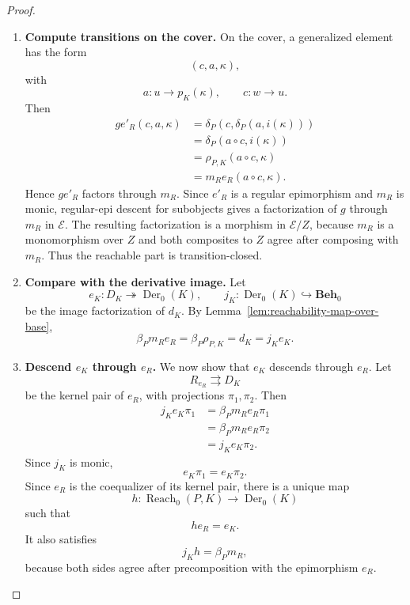 \begin{proof}
\begin{enumerate}
        \item \textbf{Compute transitions on the cover.} On the cover, a generalized element has the form
        \[
            (c,a,\kappa),
        \]
        with
        \[
            a:u\to p_K(\kappa),
            \qquad
            c:w\to u.
        \]
        Then
        \[
            \begin{aligned}
                g e'_R(c,a,\kappa)
                &=
                \delta_P(c,\delta_P(a,i(\kappa)))
                \\
                &=
                \delta_P(a\circ c,i(\kappa))
                \\
                &=
                \rho_{P,K}(a\circ c,\kappa)
                \\
                &=
                m_R e_R(a\circ c,\kappa).
            \end{aligned}
        \]
        Hence \(g e'_R\) factors through \(m_R\). Since \(e'_R\) is a regular epimorphism and \(m_R\) is monic, regular-epi descent for subobjects gives a factorization of \(g\) through \(m_R\) in \(\mathcal E\). The resulting factorization is a morphism in \(\mathcal E/Z\), because \(m_R\) is a monomorphism over \(Z\) and both composites to \(Z\) agree after composing with \(m_R\). Thus the reachable part is transition-closed.

        \item \textbf{Compare with the derivative image.} Let
        \[
            e_K:D_K\twoheadrightarrow \operatorname{Der}_0(K),
            \qquad
            j_K:\operatorname{Der}_0(K)\hookrightarrow\mathbf{Beh}_0
        \]
        be the image factorization of \(d_K\). By Lemma~\ref{lem:reachability-map-over-base},
        \[
            \beta_Pm_Re_R
            =
            \beta_P\rho_{P,K}
            =
            d_K
            =
            j_Ke_K.
        \]

        \item \textbf{Descend \(e_K\) through \(e_R\).} We now show that \(e_K\) descends through \(e_R\). Let
        \[
            R_{e_R}\rightrightarrows D_K
        \]
        be the kernel pair of \(e_R\), with projections \(\pi_1,\pi_2\). Then
        \[
            \begin{aligned}
                j_Ke_K\pi_1
                &=
                \beta_Pm_Re_R\pi_1
                \\
                &=
                \beta_Pm_Re_R\pi_2
                \\
                &=
                j_Ke_K\pi_2.
            \end{aligned}
        \]
        Since \(j_K\) is monic,
        \[
            e_K\pi_1=e_K\pi_2.
        \]
        Since \(e_R\) is the coequalizer of its kernel pair, there is a unique map
        \[
            h:\operatorname{Reach}_0(P,K)\to\operatorname{Der}_0(K)
        \]
        such that
        \[
            he_R=e_K.
        \]
        It also satisfies
        \[
            j_Kh=\beta_Pm_R,
        \]
        because both sides agree after precomposition with the epimorphism \(e_R\).


\end{enumerate}
\end{proof}
